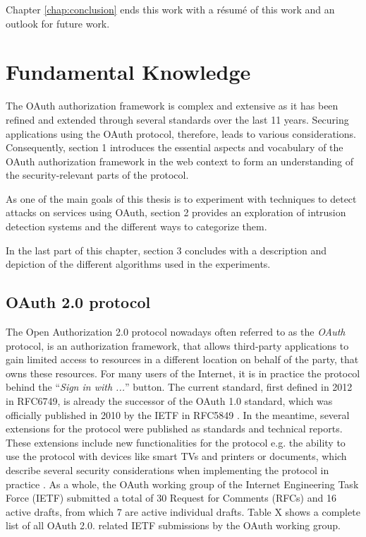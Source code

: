 \documentclass[
    fontsize=12pt,
    headings=small,
    parskip=half,           %
    bibliography=totoc,
    numbers=noenddot,       %
    open=any,               %
    ]{scrreprt}
\begin{document}
Chapter \ref{chap:conclusion} ends this work with a résumé of this work and an outlook for future work.


\chapter{Fundamental Knowledge}
\label{chap:fundamental_knowledge}
The OAuth authorization framework is complex and extensive as it has been refined and extended through several standards over the last 11 years. Securing applications using the OAuth protocol, therefore, leads to various considerations. Consequently, section 1 introduces the essential aspects and vocabulary of the OAuth authorization framework in the web context to form an understanding of the security-relevant parts of the protocol.

As one of the main goals of this thesis is to experiment with techniques to detect attacks on services using OAuth, section 2 provides an exploration of intrusion detection systems and the different ways to categorize them.

In the last part of this chapter, section 3 concludes with a description and depiction of the different algorithms used in the experiments.

\section{OAuth 2.0 protocol}
The Open Authorization 2.0 protocol nowadays often referred to as the
\emph{OAuth} protocol, is an authorization framework, that allows third-party
applications to gain limited access to resources in a different location on
behalf of the party, that owns these resources. For many users of the Internet,
it is in practice the protocol behind the ``\emph{Sign in with ...}'' button.
The current standard, first defined in 2012 in RFC6749, is already the
successor of the OAuth 1.0 standard, which was officially published in 2010 by
the IETF in RFC5849 \cite{hammer2010rfc}. In the meantime, several extensions
for the protocol were published as standards and technical reports. These
extensions include new functionalities for the protocol e.g. the ability to use
the protocol with devices like smart TVs and printers \cite{denniss2019oauth}
or documents, which describe several security considerations when implementing
the protocol in practice \cite{lodderstedt2020oauth}. As a whole, the OAuth
working group of the Internet Engineering Task Force (IETF) submitted a total
of 30 Request for Comments (RFCs) and 16 active drafts, from which 7 are active
individual drafts. Table X shows a complete list of all OAuth 2.0. related IETF
submissions by the OAuth working group. 
\end{document}
